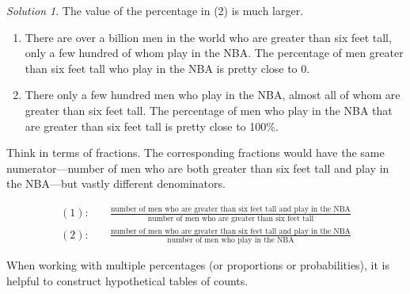 \documentclass[
  letterpaper,
  DIV=11,
  numbers=noendperiod]{scrreprt}
\providecommand{\tightlist}{%
  \setlength{\itemsep}{0pt}\setlength{\parskip}{0pt}}
\theoremstyle{plain}
\theoremstyle{definition}
\theoremstyle{definition}
\theoremstyle{definition}
\theoremstyle{remark}
\newtheorem{refsolution}{Solution}[chapter]
\begin{document}
\begin{tcolorbox}[enhanced jigsaw, opacityback=0, rightrule=.15mm, coltitle=black, colframe=quarto-callout-tip-color-frame, toprule=.15mm, colbacktitle=quarto-callout-tip-color!10!white, opacitybacktitle=0.6, left=2mm, toptitle=1mm, breakable, title={Solution (click to expand)}, bottomtitle=1mm, colback=white, leftrule=.75mm, titlerule=0mm, arc=.35mm, bottomrule=.15mm]

\begin{refsolution}
The value of the percentage in (2) is much larger.

\begin{enumerate}
\def\labelenumi{\arabic{enumi}.}
\tightlist
\item
  There are over a billion men in the world who are greater than six
  feet tall, only a few hundred of whom play in the NBA. The percentage
  of men greater than six feet tall who play in the NBA is pretty close
  to 0.
\item
  There only a few hundred men who play in the NBA, almost all of whom
  are greater than six feet tall. The percentage of men who play in the
  NBA that are greater than six feet tall is pretty close to 100\%.
\end{enumerate}

Think in terms of fractions. The corresponding fractions would have the
same numerator---number of men who are both greater than six feet tall
and play in the NBA---but vastly different denominators.

\begin{align*}
(1): & \quad \frac{\text{number of men who are greater than six feet tall and play in the NBA}}{\text{number of men who are greater than six feet tall}}\\
(2): & \quad \frac{\text{number of men who are greater than six feet tall and play in the NBA}}{\text{number of men who play in the NBA}} 
\end{align*}

\label{sol-nba-conditional}

\end{refsolution}

\end{tcolorbox}

When working with multiple percentages (or proportions or
probabilities), it is helpful to construct hypothetical tables of
counts.
\end{document}
